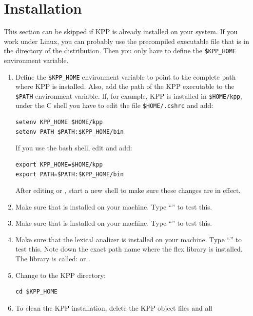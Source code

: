\documentclass[twoside]{article}
\begin{document}
\sloppy

\tableofcontents\clearpage

\section{Installation}
\label{sec:install}

This section can be skipped if KPP is already installed on your system.
If you work under Linux, you can probably use the precompiled executable
file that is in the  directory of the distribution. Then you
only have to define the \verb|$KPP_HOME| environment variable.
%
\begin{enumerate}
\item Define the \verb|$KPP_HOME| environment variable to point to the
  complete path where KPP is installed. Also, add the path of the KPP
  executable to the \verb|$PATH| environment variable. If, for example,
  KPP is installed in \verb|$HOME/kpp|, under the C shell you have to
  edit the file \verb|$HOME/.cshrc| and add:
\begin{verbatim}
setenv KPP_HOME $HOME/kpp
setenv PATH $PATH:$KPP_HOME/bin
\end{verbatim} %
  If you use the bash shell, edit  and add: %
\begin{verbatim}
export KPP_HOME=$HOME/kpp
export PATH=$PATH:$KPP_HOME/bin
\end{verbatim} %
  After editing  or , start a new shell to
  make sure these changes are in effect.
\item Make sure that  is installed on your machine. Type
  ``'' to test this.
\item Make sure that  is installed on your machine. Type
  ``'' to test this.
\item Make sure that the lexical analizer  is installed on
  your machine. Type ``'' to test this. Note down
  the exact path name where the flex library is installed. The library
  is called:  or .
\item Change to the KPP directory:
\begin{verbatim}
cd $KPP_HOME
\end{verbatim} %
\item To clean the KPP installation, delete the KPP object files and all

\end{enumerate}
\end{document}
